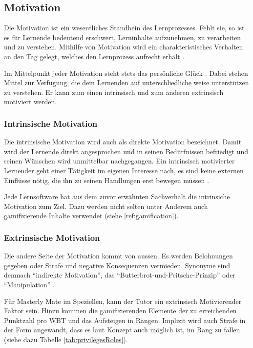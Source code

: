 \subsection{Motivation}\label{ref:basMotivation}
Die Motivation ist ein wesentliches Standbein des Lernprozesses. Fehlt sie, so
ist es für Lernende bedeutend erschwert, Lerninhalte aufzunehmen, zu verarbeiten
und zu verstehen. Mithilfe von Motivation wird ein charakteristisches Verhalten
an den Tag gelegt, welches den Lernprozess aufrecht erhält \cite{jacobs:2010}.

Im Mittelpunkt jeder Motivation steht stets das persönliche Glück
\cite{stampfl:2012}. Dabei stehen Mittel zur Verfügung, die dem Lernenden auf
unterschliedliche weise unterstützen zu verstehen. Er kann zum einen
intrinsisch und zum anderen extrinsisch motiviert werden.

\subsubsection{Intrinsische Motivation}\label{ref:intrinsischeMotivation}
Die intrinsische Motivation wird auch als direkte Motivation bezeichnet. Damit
wird der Lernende direkt angesprochen und in seinen Bedürfnissen befriedigt und
seinen Wünschen wird unmittelbar nachgegangen. Ein intrinsisch motivierter
Lernender geht einer Tätigkeit im eigenen Interesse nach, es sind keine externen
Einflüsse nötig, die ihn zu seinen Handlungen erst bewegen müssen
\cite{jacobs:2010}.

Jede Lernsoftware hat aus dem zuvor erwähnten Sachverhalt die intrinsiche
Motivation zum Ziel. Dazu werden nicht selten unter Anderem auch gamifizierende
Inhalte verwendet (siehe \ref{ref:gamification}).

\subsubsection{Extrinsische Motivation}\label{ref:extrinsischeMotivation}
Die andere Seite der Motivation kommt von aussen. Es werden Belohnungen gegeben
oder Strafe und negative Konsequenzen vermieden. Synonyme sind demnach
"`indirekte Motivation"', das "`Butterbrot-und-Peitsche-Prinzip"' oder
"`Manipulation"' \cite{jacobs:2010}.

Für Masterly Mate im Speziellen, kann der Tutor ein extrinsisch Motivierender
Faktor sein. Hinzu kommen die gamifizierenden Elemente der zu erreichenden
Punktzahl pro WBT und das Aufsteigen in Rängen. Implizit wird auch Strafe in der
Form angewandt, dass es laut Konzept auch möglich ist, im Rang zu fallen
(siehe dazu Tabelle \ref{tab:privilegesRoles}).

